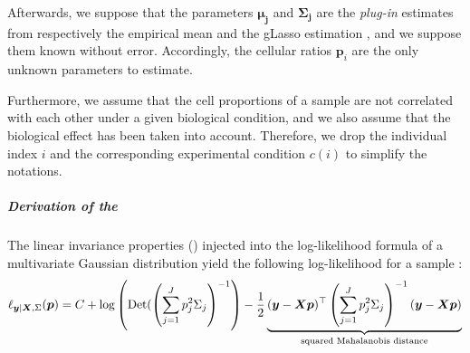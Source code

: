 Afterwards, we suppose that the parameters $\boldsymbol{\mu_j}$ and $\boldsymbol{\Sigma_j}$ are the \textit{plug-in} estimates from respectively the empirical mean and the gLasso estimation , and we suppose them known without error. Accordingly, the cellular ratios $\boldsymbol{p}_i$ are the only unknown parameters to estimate.

Furthermore, we assume that the cell proportions of a sample are not correlated with each other under a given biological condition, and we also assume that the biological effect has been taken into account.  Therefore, we drop the individual index $i$ and the corresponding experimental condition $c(i)$ to simplify the notations.

\subparagraph{Derivation of the }

The linear invariance properties () injected into the log-likelihood formula of a multivariate Gaussian distribution  yield the following log-likelihood for a sample :
\begin{equation}
    \label{eq:12}
\ell_{\boldsymbol{y} | \boldsymbol{X}, \Sigma}(\boldsymbol{p})=C + \log\left(\operatorname*{Det}(\left(\sum_{j=1}^J p_{j}^2\Sigma_{j}\right)^{-1}\right) - \frac{1}{2} \underbrace{(\boldsymbol{y} - \boldsymbol{X} \boldsymbol{p})^\top \left(\sum_{j=1}^J p_{j}^2\Sigma_{j}\right)^{-1} (\boldsymbol{y} - \boldsymbol{X}\boldsymbol{p})}_{\text{squared Mahalanobis distance}}   
\end{equation}

